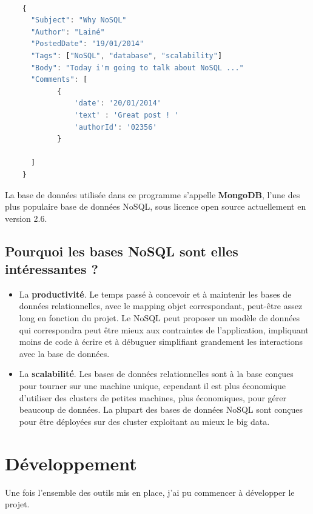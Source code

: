 \documentclass{report}
\begin{document}
\begin{lstlisting}[language=javascript, caption=Exemple d'un document JSON]
	
	{
	  "Subject": "Why NoSQL"  
	  "Author": "Lainé"  
	  "PostedDate": "19/01/2014"  
	  "Tags": ["NoSQL", "database", "scalability"]
	  "Body": "Today i'm going to talk about NoSQL ..."
	  "Comments": [
	  		{
	  			'date': '20/01/2014'
	  			'text' : 'Great post ! '
	  			'authorId': '02356'
	  		}

	  ]
	}
\end{lstlisting}  
La base de données utilisée dans ce programme s'appelle \textbf{\gls{MongoDB}}, l'une des plus populaire base de données \gls{NoSQL}, sous licence open source actuellement en version 2.6.

\subsection{Pourquoi les bases NoSQL sont elles intéressantes ? }

\begin{itemize}
	\item La \textbf{productivité}. Le temps passé à concevoir et à maintenir les bases de données relationnelles, avec le mapping objet correspondant, peut-être assez long en fonction du projet. Le \gls{NoSQL} peut proposer un modèle de données qui correspondra peut être mieux aux contraintes de l'application, impliquant moins de code à écrire et à débuguer simplifiant grandement les interactions avec la base de données.
	\item La \textbf{scalabilité}. Les bases de données relationnelles sont à la base conçues pour tourner sur une machine unique, cependant il est plus économique d'utiliser des clusters de petites machines, plus économiques, pour gérer beaucoup de données. La plupart des bases de données \gls{NoSQL} sont conçues pour être déployées sur des \gls{cluster} exploitant au mieux le \gls{big data}.   
\end{itemize}


\section{Développement}
Une fois l'ensemble des outils mis en place, j'ai pu commencer à développer le projet.
\end{document}
